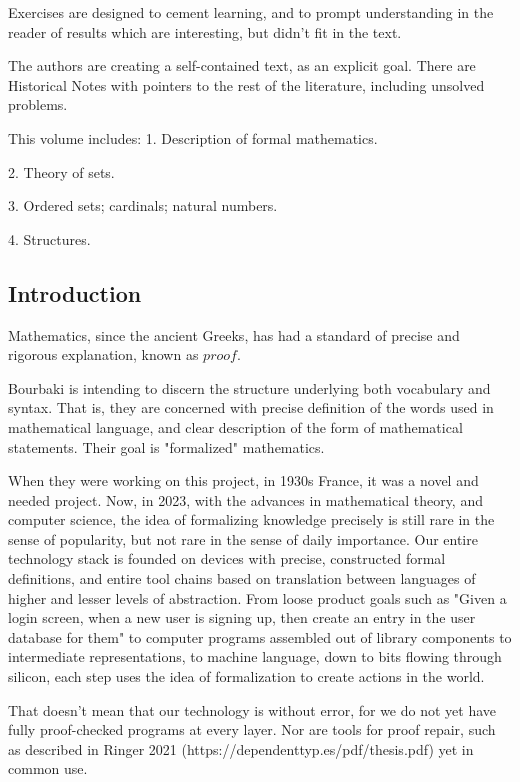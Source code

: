 \documentclass[]{scrartcl}
\begin{document}
Exercises are designed to cement learning, and to prompt understanding in the reader of results which are interesting, but didn't fit in the text.

The authors are creating a self-contained text, as an explicit goal. There are Historical Notes with pointers to the rest of the literature, including unsolved problems.

This volume includes:
1. Description of formal mathematics.

2. Theory of sets.

3. Ordered sets; cardinals; natural numbers.

4. Structures.

\subsection{Introduction}

Mathematics, since the ancient Greeks, has had a standard of precise and rigorous explanation, known as ${proof}$.

Bourbaki is intending to discern the structure underlying both vocabulary and syntax. That is, they are concerned with precise definition of the words used in mathematical language, and clear description of the form of mathematical statements. Their goal is "formalized" mathematics.

When they were working on this project, in 1930s France, it was a novel and needed project. Now, in 2023, with the advances in mathematical theory, and computer science, the idea of formalizing knowledge precisely is still rare in the sense of popularity, but not rare in the sense of daily importance. Our entire technology stack is founded on devices with precise, constructed formal definitions, and entire tool chains based on translation between languages of higher and lesser levels of abstraction. From loose product goals such as "Given a login screen, when a new user is signing up, then create an entry in the user database for them" to computer programs assembled out of library components to intermediate representations, to machine language, down to bits flowing through silicon, each step uses the idea of formalization to create actions in the world.

That doesn't mean that our technology is without error, for we do not yet have fully proof-checked programs at every layer. Nor are tools for proof repair, such as described in Ringer 2021 (https://dependenttyp.es/pdf/thesis.pdf) yet in common use.
\end{document}

